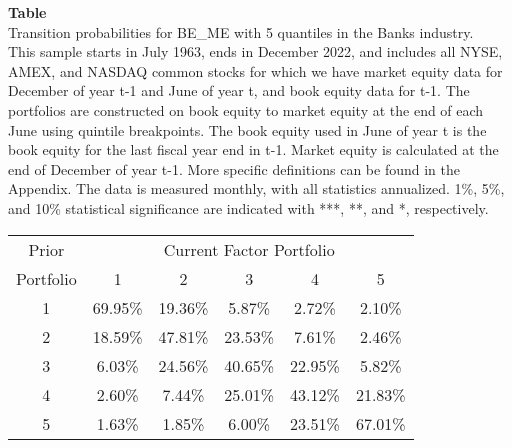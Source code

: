\begin{table*}[ht!]
\raggedright
{}
\label{tab: transition_probs_BE_ME_Banks_with_5_quantiles}
\textbf{Table \thetable} \\
Transition probabilities for BE_ME with 5 quantiles in the Banks industry. \\
\hspace*{1em}This sample starts in July 1963, ends in December 2022, and includes all NYSE, AMEX, and NASDAQ common stocks for which we have market equity data for December of year t-1 and June of year t, and book equity data for t-1. The portfolios are constructed on book equity to market equity at the end of each June using quintile breakpoints.  The book equity used in June of year t is the book equity for the last fiscal year end in t-1.  Market equity is calculated at the end of December of year t-1.  More specific definitions can be found in the Appendix.  The data is measured monthly, with all statistics annualized.  1\%, 5\%, and 10\% statistical significance are indicated with ***, **, and *, respectively. \\
\vspace{0.5em}
\centering
\begin{adjustbox}{max width=\textwidth}
\begin{tabular}{@{}cccccc@{}}
\toprule
Prior & \multicolumn{5}{c}{Current Factor Portfolio} \\
Portfolio & 1 & 2 & 3 & 4 & 5 \\
\midrule
1 & 69.95\% & 19.36\% & 5.87\% & 2.72\% & 2.10\% \\
2 & 18.59\% & 47.81\% & 23.53\% & 7.61\% & 2.46\% \\
3 & 6.03\% & 24.56\% & 40.65\% & 22.95\% & 5.82\% \\
4 & 2.60\% & 7.44\% & 25.01\% & 43.12\% & 21.83\% \\
5 & 1.63\% & 1.85\% & 6.00\% & 23.51\% & 67.01\% \\
\bottomrule
\end{tabular}
\end{adjustbox}
\end{table*}